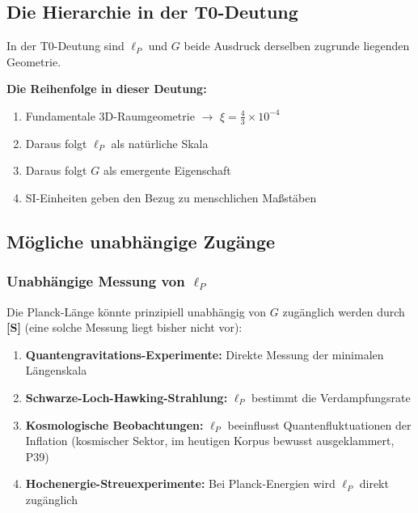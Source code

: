 	\subsection{Die Hierarchie in der T0-Deutung}
	
	\begin{tcolorbox}[colback=green!5!white,colframe=green!75!black,title=Interpretation im T0-Rahmen]
		In der T0-Deutung sind $\ell_P$ und $G$ beide Ausdruck derselben zugrunde liegenden Geometrie.
		
		\textbf{Die Reihenfolge in dieser Deutung:}
		\begin{enumerate}
			\item Fundamentale 3D-Raumgeometrie $\rightarrow$ $\xi = \frac{4}{3} \times 10^{-4}$
			\item Daraus folgt $\ell_P$ als natürliche Skala
			\item Daraus folgt $G$ als emergente Eigenschaft  
			\item SI-Einheiten geben den Bezug zu menschlichen Maß{}stäben
		\end{enumerate}
	\end{tcolorbox}
	
	\subsection{Mögliche unabhängige Zugänge}
	
	\subsubsection{Unabhängige Messung von $\ell_P$}
	
	Die Planck-Länge könnte prinzipiell unabhängig von $G$ zugänglich werden durch \textbf{[S]} (eine solche Messung liegt bisher nicht vor):
	
	\begin{enumerate}
		\item \textbf{Quantengravitations-Experimente:} Direkte Messung der minimalen Längenskala
		\item \textbf{Schwarze-Loch-Hawking-Strahlung:} $\ell_P$ bestimmt die Verdampfungsrate
		\item \textbf{Kosmologische Beobachtungen:} $\ell_P$ beeinflusst Quantenfluktuationen der Inflation (kosmischer Sektor, im heutigen Korpus bewusst ausgeklammert, P39)
		\item \textbf{Hochenergie-Streuexperimente:} Bei Planck-Energien wird $\ell_P$ direkt zugänglich
	\end{enumerate}
	
